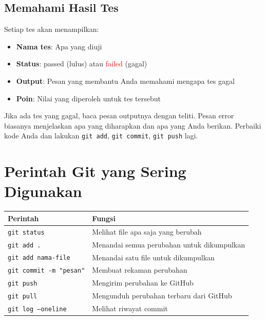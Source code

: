 \documentclass[
    a4paper,
    11pt,
    parskip=half
]{scrartcl}
\begin{document}
\subsection{Memahami Hasil Tes}

Setiap tes akan menampilkan:
\begin{itemize}
    \item \textbf{Nama tes}: Apa yang diuji
    \item \textbf{Status}: \textcolor{green!50!black}{passed} (lulus) atau \textcolor{red}{failed} (gagal)
    \item \textbf{Output}: Pesan yang membantu Anda memahami mengapa tes gagal
    \item \textbf{Poin}: Nilai yang diperoleh untuk tes tersebut
\end{itemize}

\begin{tipbox}
Jika ada tes yang gagal, baca pesan outputnya dengan teliti. Pesan error biasanya menjelaskan apa yang diharapkan dan apa yang Anda berikan. Perbaiki kode Anda dan lakukan \texttt{git add}, \texttt{git commit}, \texttt{git push} lagi.
\end{tipbox}

\section{Perintah Git yang Sering Digunakan}
\label{sec:git-reference}

\begin{center}
\begin{tabular}{ll}
\hline
\textbf{Perintah} & \textbf{Fungsi} \\
\hline
\texttt{git status} & Melihat file apa saja yang berubah \\
\texttt{git add .} & Menandai semua perubahan untuk dikumpulkan \\
\texttt{git add nama-file} & Menandai satu file untuk dikumpulkan \\
\texttt{git commit -m "pesan"} & Membuat rekaman perubahan \\
\texttt{git push} & Mengirim perubahan ke GitHub \\
\texttt{git pull} & Mengunduh perubahan terbaru dari GitHub \\
\texttt{git log --oneline} & Melihat riwayat commit \\
\hline
\end{tabular}
\end{center}
\end{document}
